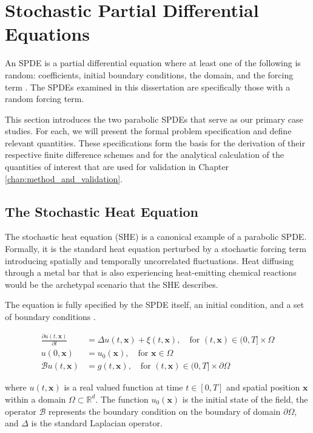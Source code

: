 \section{Stochastic Partial Differential Equations}

An SPDE is a partial differential equation
where at least one of the following is random: coefficients, 
initial boundary conditions, the domain, and the forcing term 
\cite{lototsky2017stochastic}. The SPDEs examined in this dissertation
are specifically those with a random forcing term.

This section introduces the two parabolic SPDEs that 
serve as our primary case studies. For each, we 
will present the formal problem specification and define relevant 
quantities. These specifications form the basis for the derivation
of their respective finite difference schemes and for the analytical 
calculation of the quantities of interest that are used for 
validation in Chapter \ref{chap:method_and_validation}.

\subsection{The Stochastic Heat Equation}

The stochastic heat equation (SHE) is a canonical example of a parabolic SPDE.
Formally, it is the standard heat equation perturbed by a stochastic
forcing term introducing spatially and temporally uncorrelated 
fluctuations. Heat diffusing through a metal bar 
that is also experiencing heat-emitting chemical reactions would be the archetypal
scenario that the SHE describes.

The equation is fully specified by the SPDE itself, an initial condition, and 
a set of boundary conditions \cite{lototsky2017stochastic,pardoux2021stochastic}.

\begin{align}\label{eq:she_spde}
\frac{\partial u(t,\mathbf{x})}{\partial t} &= \Delta u(t,\mathbf{x}) + \xi(t,\mathbf{x}), 
\quad \text{for } (t, \mathbf{x}) \in (0, T] \times \Omega \tag{SHE} \\
u(0, \mathbf{x}) &= u_0(\mathbf{x}), \quad \text{for } \mathbf{x} \in \Omega \nonumber \\
\mathcal{B}u(t, \mathbf{x}) &= g(t, \mathbf{x}), \quad \text{for } 
(t, \mathbf{x}) \in (0, T] \times \partial \Omega \nonumber
\end{align}

where $u(t,\mathbf{x})$ is a real valued function at time $t \in [0, T]$ and 
spatial position $\mathbf{x}$ within a domain $\Omega \subset \mathbb{R}^d$. 
The function $u_0(\mathbf{x})$ is the initial state of the field,
the operator $\mathcal{B}$ represents the boundary condition on the boundary of domain 
$\partial \Omega$, and $\Delta$ is the standard Laplacian operator.

